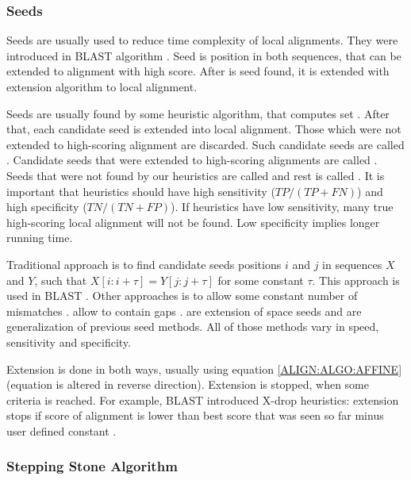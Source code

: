 \subsubsection{Seeds}

Seeds are usually used to reduce time complexity of local alignments.  They were
introduced in BLAST algorithm \cite{Altschul1990}.  Seed is position in both
sequences, that can be extended to alignment with high score. After is seed
found, it is extended with extension algorithm to local alignment.

Seeds are usually found by some heuristic algorithm, that computes set
. After that, each candidate seed is extended into
local alignment. Those which were not extended to high-scoring alignment are
discarded. Such candidate seeds are called .
Candidate seeds that were extended to high-scoring alignments are called
.  Seeds that were not found by our heuristics
are called  and rest is called
. It is important that heuristics should have
high sensitivity ($TP/(TP+FN)$) and high specificity ($TN/(TN+FP)$). If
heuristics have low sensitivity, many true high-scoring local alignment will not
be found. Low specificity implies longer running time. 

Traditional approach is to find candidate seeds positions $i$ and $j$ in
sequences $X$ and $Y$, such that $X[i:i+\tau]=Y[j:j+\tau]$ for some constant
$\tau$. This approach is used in BLAST \cite{Altschul1990}. Other approaches is
to allow some constant number of mismatches \cite{Kent2002}.  allow to contain gaps \cite{Ma2002}. 
\cite{Brejova2005vector} are extension of space seeds and  \cite{Csuros2005} are generalization of previous seed methods. All of
those methods vary in speed, sensitivity and specificity.

Extension is done in both ways, usually using equation \ref{ALIGN:ALGO:AFFINE}
(equation is altered in reverse direction). Extension is stopped, when some
criteria is reached. For example, BLAST introduced X-drop heuristics: extension stops
if score of alignment is lower than best score that was seen so far minus user
defined constant \cite{Altschul1997}.


\subsubsection{Stepping Stone Algorithm}

